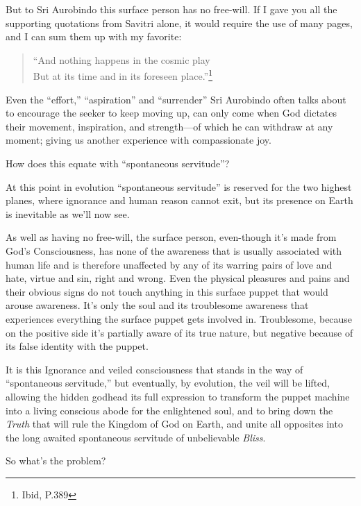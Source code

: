 \documentclass[12pt,a4paper]{book}
\begin{document}
But to Sri Aurobindo this surface person has no free-will. If I gave
you all the supporting quotations from Savitri alone, it would require
the use of many pages, and I can sum them up with my favorite:

\newpage
\begin{verse}
``And nothing happens in the cosmic play\\
But at its time and in its foreseen place.''\footnote{Ibid, P.389}
\end{verse}


Even the ``effort,'' ``aspiration'' and ``surrender'' Sri Aurobindo
often talks about to encourage the seeker to keep moving up, can only
come when God dictates their movement, inspiration, and strength---of
which he can withdraw at any moment; giving us another experience with
compassionate joy.

How does this equate with ``spontaneous servitude''?

At this point in evolution ``spontaneous servitude'' is reserved for
the two highest planes, where ignorance and human reason cannot exit,
but its presence on Earth is inevitable as we'll now see.

As well as having no free-will, the surface person, even-though it's
made from God's Consciousness, has none of the awareness that is
usually associated with human life and is therefore unaffected by any
of its warring pairs of love and hate, virtue and sin, right and
wrong. Even the physical pleasures and pains and their obvious signs
do not touch anything in this surface puppet that would arouse
awareness. It's only the soul and its troublesome awareness that
experiences everything the surface puppet gets involved
in. Troublesome, because on the positive side it's partially aware of
its true nature, but negative because of its false identity with the
puppet.

It is this Ignorance and veiled consciousness that stands in the way
of ``spontaneous servitude,'' but eventually, by evolution, the veil
will be lifted, allowing the hidden godhead its full expression to
transform the puppet machine into a living conscious abode for the
enlightened soul, and to bring down the \emph{Truth} that will rule
the Kingdom of God on Earth, and unite all opposites into the long
awaited spontaneous servitude of unbelievable \emph{Bliss}.

\noindent So what's the problem?
\end{document}

